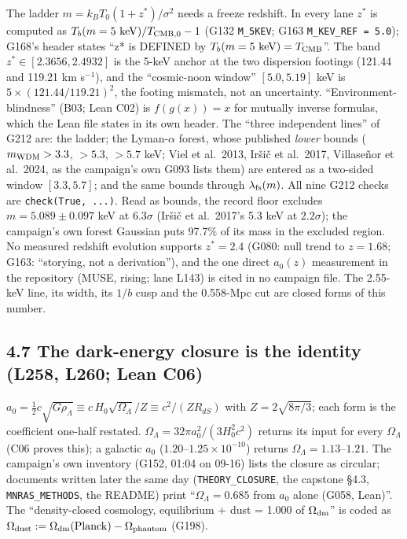 \documentclass[
  11pt,
]{article}
\begin{document}
The ladder \(m = k_B T_0 (1+z^*)/\sigma^2\) needs a freeze redshift. In
every lane \(z^*\) is computed as
\(T_b(m = 5\ {\rm keV})/T_{\rm CMB,0} - 1\) (G132 \texttt{M\_5KEV}; G163
\texttt{M\_KEV\_REF\ =\ 5.0}); G168's header states ``z* is DEFINED by
\(T_b(m = 5\ {\rm keV}) = T_{\rm CMB}\)''. The band
\(z^* \in [2.3656, 2.4932]\) is the 5-keV anchor at the two dispersion
footings (121.44 and 119.21 km s\(^{-1}\)), and the ``cosmic-noon
window'' \([5.0, 5.19]\) keV is \(5 \times (121.44/119.21)^2\), the
footing mismatch, not an uncertainty. ``Environment-blindness'' (B03;
Lean C02) is \(f(g(x)) = x\) for mutually inverse formulas, which the
Lean file states in its own header. The ``three independent lines'' of
G212 are: the ladder; the Lyman-\(\alpha\) forest, whose published
\emph{lower} bounds (\(m_{\rm WDM} > 3.3\), \(> 5.3\), \(> 5.7\) keV;
Viel et al.~2013, Iršič et al.~2017, Villaseñor et al.~2024, as the
campaign's own G093 lists them) are entered as a two-sided window
\([3.3, 5.7]\); and the same bounds through \(\lambda_{\rm fs}(m)\). All
nine G212 checks are \texttt{check(True,\ ...)}. Read as bounds, the
record floor excludes \(m = 5.089 \pm 0.097\) keV at \(6.3\sigma\)
(Iršič et al.~2017's 5.3 keV at \(2.2\sigma\)); the campaign's own
forest Gaussian puts 97.7\% of its mass in the excluded region. No
measured redshift evolution supports \(z^* = 2.4\) (G080: null trend to
\(z = 1.68\); G163: ``storying, not a derivation''), and the one direct
\(a_0(z)\) measurement in the repository (MUSE, rising; lane L143) is
cited in no campaign file. The 2.55-keV line, its width, its \(1/b\)
cusp and the 0.558-Mpc cut are closed forms of this number.

\subsection{4.7 The dark-energy closure is the identity (L258, L260;
Lean
C06)}\label{the-dark-energy-closure-is-the-identity-l258-l260-lean-c06}

\(a_0 = \tfrac12 c\sqrt{G\rho_\Lambda} \equiv c\,H_0\sqrt{\Omega_\Lambda}/Z \equiv c^2/(Z R_{dS})\)
with \(Z = 2\sqrt{8\pi/3}\); each form is the coefficient one-half
restated. \(\Omega_\Lambda = 32\pi a_0^2/(3H_0^2c^2)\) returns its input
for every \(\Omega_\Lambda\) (C06 proves this); a galactic \(a_0\)
(\(1.20\)--\(1.25\times10^{-10}\)) returns
\(\Omega_\Lambda = 1.13\)--\(1.21\). The campaign's own inventory (G152,
01:04 on 09-16) lists the closure as circular; documents written later
the same day (\texttt{THEORY\_CLOSURE}, the capstone §4.3,
\texttt{MNRAS\_METHODS}, the README) print ``\(\Omega_\Lambda = 0.685\)
from \(a_0\) alone (G058, Lean)''. The ``density-closed cosmology,
equilibrium + dust = 1.000 of \(\Omega_{\rm dm}\)'' is coded as
\(\Omega_{\rm dust} := \Omega_{\rm dm}({\rm Planck}) - \Omega_{\rm phantom}\)
(G198).
\end{document}
